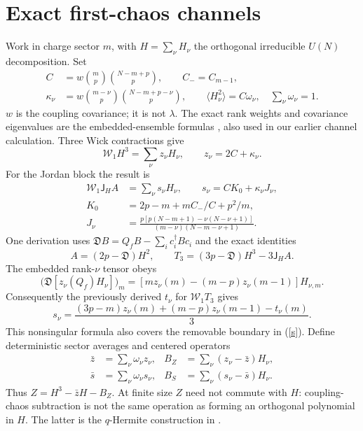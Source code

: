 \documentclass[11pt,a4paper]{article}
\newcommand{\av}[1]{\langle #1\rangle}
\newcommand{\W}{\mathcal W}
\newcommand{\JH}{\mathsf J_H}
\begin{document}
\section{Exact first-chaos channels}
Work in charge sector $m$, with $H=\sum_\nu H_\nu$ the orthogonal
irreducible $U(N)$ decomposition. Set
\begin{align}
 C&=w\binom mp\binom{N-m+p}p,\qquad C_-=C_{m-1},\\
 \kappa_\nu&=w\binom{m-\nu}p\binom{N-m+p-\nu}p,\qquad
 \av{H_\nu^2}=C\omega_\nu,\quad \sum_\nu\omega_\nu=1.
\end{align}
$w$ is the coupling covariance; it is not $\lambda$. The exact rank
weights and covariance eigenvalues are the embedded-ensemble formulas
\cite{kota}, also used in our earlier channel calculation.
Three Wick contractions give
\begin{equation}
 \W_1H^3=\sum_\nu z_\nu H_\nu,\qquad z_\nu=2C+\kappa_\nu.\label{z}
\end{equation}
For the Jordan block the result is
\begin{align}
 \W_1\JH A&=\sum_\nu s_\nu H_\nu,\qquad s_\nu=CK_0+\kappa_\nu J_\nu,\label{s}\\
 K_0&=2p-m+mC_-/C+p^2/m,\\
 J_\nu&=\frac{p[p(N-m+1)-\nu(N-\nu+1)]}
 {(m-\nu)(N-m-\nu+1)}.
\end{align}
One derivation uses $\mathfrak D B=Q_fB-\sum_i c_i^\dagger Bc_i$
and the exact identities
\[
 A=(2p-\mathfrak D)H^2,\qquad
 T_3=(3p-\mathfrak D)H^3-3\JH A.
\]
The embedded rank-$\nu$ tensor obeys
\[
 \bigl(\mathfrak D[z_\nu(Q_f)H_\nu]\bigr)_m
 =[mz_\nu(m)-(m-p)z_\nu(m-1)]H_{\nu,m}.
\]
Consequently the previously derived $t_\nu$ for $\W_1T_3$ gives
\begin{equation}
 s_\nu=\frac{(3p-m)z_\nu(m)+(m-p)z_\nu(m-1)-t_\nu(m)}3.\label{safe}
\end{equation}
This nonsingular formula also covers the removable boundary in
(\ref{s}). Define deterministic sector averages and centered operators
\begin{align}
 \bar z&=\sum_\nu\omega_\nu z_\nu,& B_Z&=\sum_\nu(z_\nu-\bar z)H_\nu,\\
 \bar s&=\sum_\nu\omega_\nu s_\nu,& B_S&=\sum_\nu(s_\nu-\bar s)H_\nu.
\end{align}
Thus $Z=H^3-\bar zH-B_Z$. At finite size $Z$ need not commute
with $H$: coupling-chaos subtraction is not the same operation as
forming an orthogonal polynomial in $H$. The latter is the
$q$-Hermite construction in \cite{tall}.
\end{document}
